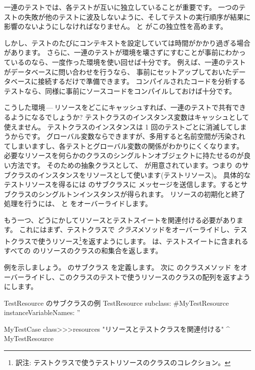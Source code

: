 \documentclass[a4paper,10pt,twoside]{book}
\begin{document}
一連のテストでは、各テストが互いに独立していることが重要です。
一つのテストの失敗が他のテストに波及しないように、そしてテストの実行順序が結果に影響のないようにしなければなりません。
 と  がこの独立性を高めます。

しかし、テストのたびにコンテキストを設定していては時間がかかり過ぎる場合があります。
さらに、一連のテストが環境を壊さずにすむことが事前にわかっているのなら、一度作った環境を使い回せば十分です。
例えば、一連のテストがデータベースに問い合わせを行うなら、
事前にセットアップしておいたデータベースに接続するだけで準備できます。
コンパイルされたコードを分析するテストなら、同様に事前にソースコードをコンパイルしておけば十分です。

こうした環境\,---\,リソースをどこにキャッシュすれば、一連のテストで共有できるようになるでしょうか?
テストクラスのインスタンス変数はキャッシュとして使えません。
テストクラスのインスタンスは 1 回のテストごとに消滅してしまうからです。
グローバル変数ならできますが、多用すると名前空間が汚染されてしまいますし、各テストとグローバル変数の関係がわかりにくくなります。
必要なリソースを何らかのクラスのシングルトンオブジェクトに持たせるのが良い方法です。
そのための抽象クラスとして、 が用意されています。つまり  のサブクラスのインスタンスをリソースとして使います(テストリソース)。
具体的なテストリソースを得るには  のサブクラスに  メッセージを送信します。するとサブクラスのシングルトンインスタンスが得られます。
リソースの初期化と終了処理を行うには、 と  をオーバーライドします。

もう一つ、どうにかしてリソースとテストスイートを関連付ける必要があります。
これにはまず、テストクラスで  \emph{クラス}メソッドをオーバーライドし、テストクラスで使うリソース\footnote{訳注: テストクラスで使うテストリソースのクラスのコレクション。}を返すようにします。
\ab{}
 は、テストスイートに含まれるすべての  のリソースのクラスの和集合を返します。

例を示しましょう。
 のサブクラス  を定義します。
次に  のクラスメソッド  をオーバーライドし、このクラスのテストで使うリソースのクラスの配列を返すようにします。

\begin{classdef}[mytestresource]{TestResource のサブクラスの例}
TestResource subclass: #MyTestResource
	instanceVariableNames: ''

MyTestCase class>>>resources
	"リソースとテストクラスを関連付ける"
	^{ MyTestResource }
\end{classdef}
\end{document}
